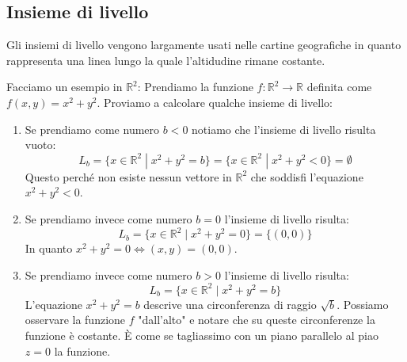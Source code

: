 \subsection{Insieme di livello}
Gli insiemi di livello vengono largamente usati nelle cartine geografiche in quanto rappresenta una linea lungo la quale l'altidudine rimane costante. 

Facciamo un esempio in $\mathbb{R}^2$: Prendiamo la funzione $f: \mathbb{R}^2 \to \mathbb{R}$ definita come $f(x, y) = x^2 + y^2$. Proviamo a calcolare qualche insieme di livello:
\begin{enumerate}
	\item Se prendiamo come numero $b < 0$ notiamo che l'insieme di livello risulta vuoto:
		\begin{equation*}
			L_b = \{x \in \mathbb{R}^2 \;|\; x^2 + y^2 = b\} = \{x \in \mathbb{R}^2 \;|\; x^2 + y^2 < 0\} = \emptyset
		\end{equation*}
		Questo perché non esiste nessun vettore in $\mathbb{R}^2$ che soddisfi l'equazione $x^2 + y^2 < 0$.
	
	\item Se prendiamo invece come numero $b = 0$ l'insieme di livello risulta:
		\begin{equation*}
			L_b = \{x \in \mathbb{R}^2 \;|\; x^2 + y^2 = 0\} = \{(0, 0)\}
		\end{equation*}
		In quanto $x^2 + y^2 = 0 \iff (x, y) = (0, 0)$.

	\item Se prendiamo invece come numero $b > 0$ l'insieme di livello risulta:
		\begin{equation*}
			L_b = \{x \in \mathbb{R}^2 \;|\; x^2 + y^2 = b\}
		\end{equation*}
		L'equazione $x^2 + y^2 = b$ descrive una circonferenza di raggio $\sqrt{b}$. Possiamo osservare la funzione $f$ "dall'alto" e notare che su queste circonferenze la funzione è costante. È come se tagliassimo con un piano parallelo al piao $z = 0$ la funzione. %
\end{enumerate}


